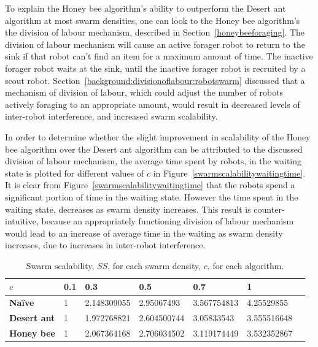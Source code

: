 To explain the Honey bee algorithm's ability to outperform the Desert ant algorithm at most swarm densities, one can look to the Honey bee algorithm's the division of labour mechanism, described in Section~\ref{honeybeeforaging}. The division of labour mechanism will cause an active forager robot to return to the sink if that robot can't find an item for a maximum amount of time. The inactive forager robot waits at the sink, until the inactive forager robot is recruited by a scout robot. Section~\ref{background:divisionoflabour:robotswarm} discussed that a mechanism of division of labour, which could adjust the number of robots actively foraging to an appropriate amount, would result in decreased levels of inter-robot interference, and increased swarm scalability.

In order to determine whether the slight improvement in scalability of the Honey bee algorithm over the Desert ant algorithm can be attributed to the discussed division of labour mechanism, the average time spent by robots, in the waiting state is plotted for different values of $c$ in Figure~\ref{swarmscalabilitywaitingtime}. It is clear from Figure~\ref{swarmscalabilitywaitingtime} that the robots spend a significant portion of time in the waiting state. However the time spent in the waiting state, decreases as swarm density increases. This result is counter-intuitive, because an appropriately functioning division of labour mechanism would lead to an increase of average time in the waiting as swarm density increases, due to increases in inter-robot interference. 


\begin{table}[]
\centering
\caption{Swarm scalability, $SS$, for each swarm density, $c$, for each algorithm.}
\label{table:swarmscalability}
\begin{tabular}{@{}lllllll@{}}
\toprule
\textbf{$c$}            & \textbf{0.1} & \textbf{0.3}         & \textbf{0.5}         & \textbf{0.7}         & \textbf{1}           \\ \midrule
\textbf{Na\"ive}    & 1   & 2.148309055 & 2.95067493  & 3.567754813 & 4.25529855  \\
\textbf{Desert ant} & 1   & 1.972768821 & 2.604500744 & 3.05833543  & 3.555516648 \\
\textbf{Honey bee}  & 1   & 2.067364168 & 2.706034502 & 3.119174449 & 3.532352867 \\ \bottomrule
\end{tabular}
\end{table}

